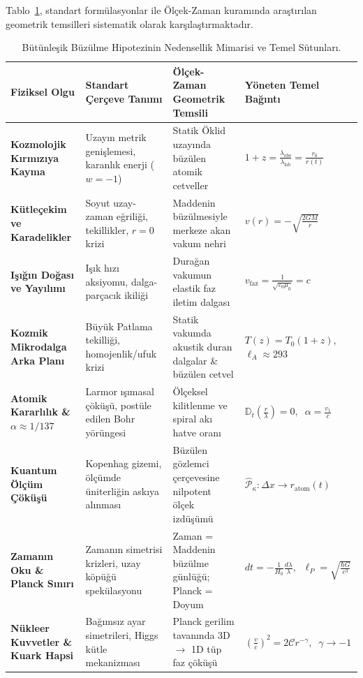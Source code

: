 Tablo~\ref{tab:nedensellik_mimarisi}, standart formülasyonlar ile Ölçek-Zaman kuramında araştırılan geometrik temsilleri sistematik olarak karşılaştırmaktadır.

\begin{table}[h!]
    \centering
    \small
    \begin{tabular}{@{}p{3.2cm}p{3.8cm}p{4.2cm}p{3.8cm}@{}}
        \toprule
        \textbf{Fiziksel Olgu} & \textbf{Standart Çerçeve Tanımı} & \textbf{Ölçek-Zaman Geometrik Temsili} & \textbf{Yöneten Temel Bağıntı} \\ \midrule
        \textbf{Kozmolojik Kırmızıya Kayma} & Uzayın metrik genişlemesi, karanlık enerji ($w=-1$) & Statik Öklid uzayında büzülen atomik cetveller & $1+z = \frac{\lambda_{\mathrm{obs}}}{\lambda_{\mathrm{lab}}} = \frac{r_0}{r(t)}$ \\ \addlinespace
        \textbf{Kütleçekim ve Karadelikler} & Soyut uzay-zaman eğriliği, tekillikler, $r=0$ krizi & Maddenin büzülmesiyle merkeze akan vakum nehri & $v(r) = -\sqrt{\frac{2GM}{r}}$ \\ \addlinespace
        \textbf{Işığın Doğası ve Yayılımı} & Işık hızı aksiyomu, dalga-parçacık ikiliği & Durağan vakumun elastik faz iletim dalgası & $v_{\mathrm{faz}} = \frac{1}{\sqrt{\varepsilon_0\mu_0}} = c$ \\ \addlinespace
        \textbf{Kozmik Mikrodalga Arka Planı} & Büyük Patlama tekilliği, homojenlik/ufuk krizi & Statik vakumda akustik duran dalgalar \& büzülen cetvel & $T(z) = T_0(1+z)$, $\ell_A \approx 293$ \\ \addlinespace
        \textbf{Atomik Kararlılık \& $\alpha \approx 1/137$} & Larmor ışımasal çöküşü, postüle edilen Bohr yörüngesi & Ölçeksel kilitlenme ve spiral akı hatve oranı & $\mathbb{D}_t\left(\frac{r}{\lambda}\right) = 0, \;\; \alpha = \frac{v_1}{c}$ \\ \addlinespace
        \textbf{Kuantum Ölçüm Çöküşü} & Kopenhag gizemi, ölçümde üniterliğin askıya alınması & Büzülen gözlemci çerçevesine nilpotent ölçek izdüşümü & $\hat{\mathcal{P}}_\kappa : \Delta x \to r_{\mathrm{atom}}(t)$ \\ \addlinespace
        \textbf{Zamanın Oku \& Planck Sınırı} & Zamanın simetrisi krizleri, uzay köpüğü spekülasyonu & Zaman = Maddenin büzülme günlüğü; Planck = Doyum & $dt = -\frac{1}{H_0}\frac{d\lambda}{\lambda}, \;\; \ell_P = \sqrt{\frac{\hbar G}{c^3}}$ \\ \addlinespace
        \textbf{Nükleer Kuvvetler \& Kuark Hapsi} & Bağımsız ayar simetrileri, Higgs kütle mekanizması & Planck gerilim tavanında 3D $\to$ 1D tüp faz çöküşü & $\left(\frac{v}{c}\right)^2 = 2\mathcal{C}r^{-\gamma}, \;\; \gamma \to -1$ \\ \bottomrule
    \end{tabular}
    \caption{Bütünleşik Büzülme Hipotezinin Nedensellik Mimarisi ve Temel Sütunları.}
    \label{tab:nedensellik_mimarisi}
\end{table}


